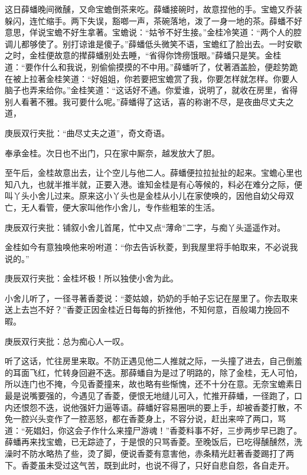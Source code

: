 \begin{parag}
    这日薛蟠晚间微醺，又命宝蟾倒茶来吃。薛蟠接碗时，故意捏他的手。宝蟾又乔装躲闪，连忙缩手。两下失误，豁啷一声，茶碗落地，泼了一身一地的茶。薛蟠不好意思，佯说宝蟾不好生拿著。宝蟾说：“姑爷不好生接。”金桂冷笑道：“两个人的腔调儿都够使了。别打谅谁是傻子。”薛蟠低头微笑不语，宝蟾红了脸出去。一时安歇之时，金桂便故意的撵薛蟠别处去睡，“省得你馋痨饿眼。”薛蟠只是笑。金桂道：“要作什么和我说，别偷偷摸摸的不中用。”薛蟠听了，仗著酒盖脸，便趁势跪在被上拉著金桂笑道：“好姐姐，你若要把宝蟾赏了我，你要怎样就怎样。你要人脑子也弄来给你。”金桂笑道：“这话好不通。你爱谁，说明了，就收在房里，省得别人看著不雅。我可要什么呢。”薛蟠得了这话，喜的称谢不尽，是夜曲尽丈夫之道，\begin{note}庚辰双行夹批：“曲尽丈夫之道”，奇文奇语。\end{note}奉承金桂。次日也不出门，只在家中厮奈，越发放大了胆。
\end{parag}


\begin{parag}
    至午后，金桂故意出去，让个空儿与他二人。薛蟠便拉拉扯扯的起来。宝蟾心里也知八九，也就半推半就，正要入港。谁知金桂是有心等候的，料必在难分之际，便叫丫头小舍儿过来。原来这小丫头也是金桂从小儿在家使唤的，因他自幼父母双亡，无人看管，便大家叫他作小舍儿，专作些粗笨的生活。\begin{note}庚辰双行夹批：铺叙小舍儿首尾，忙中又点“薄命”二字，与痴丫头遥遥作对。\end{note}金桂如今有意独唤他来吩咐道：“你去告诉秋菱，到我屋里将手帕取来，不必说我说的。”\begin{note}庚辰双行夹批：金桂坏极！所以独使小舍为此。\end{note}小舍儿听了，一径寻著香菱说：“菱姑娘，奶奶的手帕子忘记在屋里了。你去取来送上去岂不好？”香菱正因金桂近日每每的折挫他，不知何意，百般竭力挽回不暇。\begin{note}庚辰双行夹批：总为痴心人一叹。\end{note}听了这话，忙往房里来取。不防正遇见他二人推就之际，一头撞了进去，自己倒羞的耳面飞红，忙转身回避不迭。那薛蟠自为是过了明路的，除了金桂，无人可怕，所以连门也不掩，今见香菱撞来，故也略有些惭愧，还不十分在意。无奈宝蟾素日最是说嘴要强的，今遇见了香菱，便恨无地缝儿可入，忙推开薛蟠，一径跑了，口内还恨怨不迭，说他强奸力逼等语。薛蟠好容易圈哄的要上手，却被香菱打散，不免一腔兴头变作了一腔恶怒，都在香菱身上，不容分说，赶出来啐了两口，骂道：“死娼妇，你这会子作什么来撞尸游魂！”香菱料事不好，三步两步早已跑了。薛蟠再来找宝蟾，已无踪迹了，于是恨的只骂香菱。至晚饭后，已吃得醺醺然，洗澡时不防水略热了些，烫了脚，便说香菱有意害他，赤条精光赶著香菱踢打了两下。香菱虽未受过这气苦，既到此时，也说不得了，只好自悲自怨，各自走开。
\end{parag}


